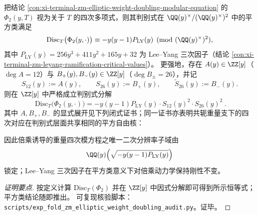 \begin{conclusion}\label{con:xi-terminal-zm-elliptic-weight-doubling-disc-squareclass}
把结论 \ref{con:xi-terminal-zm-elliptic-weight-doubling-modular-equation} 的 \(\Phi_{2}(y,T)\) 视为关于 \(T\) 的四次多项式，则其判别式在 \(\QQ(y)^{\times}/(\QQ(y)^{\times})^{2}\) 中的平方类满足
\[
\mathrm{Disc}_{T}\bigl(\Phi_{2}(y,\cdot)\bigr)\equiv -y(y-1)P_{\mathrm{LY}}(y)\pmod{(\QQ(y)^{\times})^{2}},
\]
其中 \(P_{\mathrm{LY}}(y)=256y^{3}+411y^{2}+165y+32\) 为 Lee--Yang 三次因子（结论 \ref{con:xi-terminal-zm-leyang-ramification-critical-values}）。
更强地，存在 \(A(y)\in\ZZ[y]\)（\(\deg A=12\)）与 \(B_{+}(y),B_{-}(y)\in\ZZ[y]\)（\(\deg B_{\pm}=26\)），并记
\[
S_{12}(y):=A(y),
\qquad
S_{26}(y):=B_{+}(y),
\qquad
\widetilde S_{26}(y):=B_{-}(y).
\]
则在 \(\ZZ[y]\) 中严格成立判别式分解
\[
\boxed{\;
\mathrm{Disc}_{T}\bigl(\Phi_{2}(y,\cdot)\bigr)=-y(y-1)P_{\mathrm{LY}}(y)\cdot S_{12}(y)^{2}\cdot S_{26}(y)^{2}\; }.
\]
其中 \(A,B_{+},B_{-}\) 的显式展开见下列闭式证书；同一证书亦表明共轭重量支下的四次对应在判别式层面共享相同的平方自由核：

因此倍乘诱导的重量四次模方程之唯一二次分辨率子域由
\[
\QQ(y)\Bigl(\sqrt{-y(y-1)P_{\mathrm{LY}}(y)}\Bigr)
\]
锁定；Lee--Yang 三次因子在平方类意义下对倍乘动力学保持刚性不变。
\end{conclusion}
\begin{proof}[证明要点]
按定义计算 \(\mathrm{Disc}_{T}(\Phi_2)\) 并在 \(\ZZ[y]\) 中因式分解即可得到所示恒等式；平方类结论随即推出。
可复现核验脚本：\texttt{scripts/exp\_fold\_zm\_elliptic\_weight\_doubling\_audit.py}。证毕。
\end{proof}

